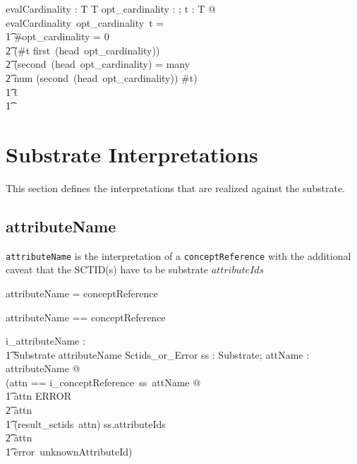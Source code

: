 \documentclass{article}
\def\spec#1{{\tt #1}}
\def\bnf#1{{\scriptsize {{#1}} }}
\begin{document}
\begin{gendef}[T]
   evalCardinality : \optional[cardinality] \fun \power T \fun \power T
\where
   \forall opt\_cardinality : \optional[cardinality]; t : \power T @ \\
evalCardinality~opt\_cardinality~t = \\
\t1 \IF \#opt\_cardinality = 0 \lor \\
\t2 (\#t \geq first~(head~opt\_cardinality)) \land \\
\t2 (second~(head~opt\_cardinality) = many \lor \\
\t2 num \inv (second~(head~opt\_cardinality)) \geq \#t) \\
\t1 \THEN t \\
\t1 \ELSE  \emptyset
\end{gendef}


\section{Substrate Interpretations}
\label{sect:substrate}
This section defines the interpretations that are realized against the substrate. 

\subsection{attributeName}
\spec{attributeName} is the interpretation of a \spec{conceptReference} with the additional caveat that the SCTID(s) have to be substrate $attributeIds$
\begin{framed}
\noindent
\bnf{attributeName = conceptReference}
\end{framed}

\begin{zed}
attributeName == conceptReference
\end{zed}

\begin{gendef}
   i\_attributeName : \\
\t1 Substrate \fun attributeName \fun Sctids\_or\_Error
\where
   \forall ss : Substrate; attName : attributeName @ \\
   (\LET attn == i\_conceptReference~ss~attName @ \\
\t1 \IF attn \in \ran ERROR \\
\t2 \THEN attn \\
\t1 \ELSE \IF (result\_sctids~attn) \subseteq ss.attributeIds \\
\t2 \THEN attn \\
\t1 \ELSE error~unknownAttributeId)
\end{gendef}
\end{document}
